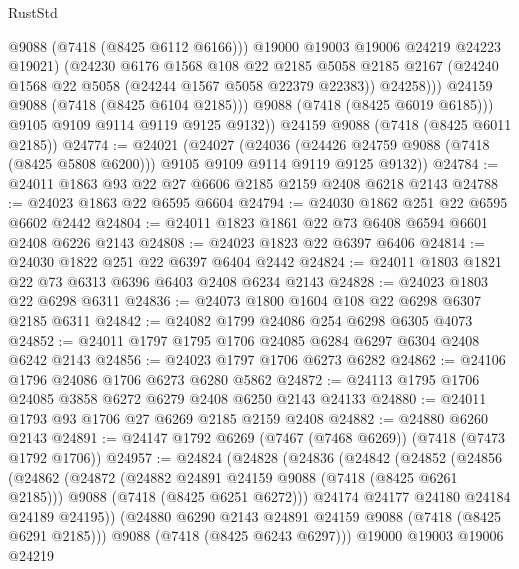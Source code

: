 \begin{lexlean}{RustStd}
\begin{coremodule}
                    @9088
                    (@7418 (@8425 @6112 @6166)))
                  @19000
                  @19003
                  @19006
                  @24219
                  @24223
                  @19021)
                (@24230
                  @6176
                  @1568
                  @108
                  @22
                  @2185
                  @5058
                  @2185
                  @2167
                  (@24240 @1568 @22 @5058 (@24244 @1567 @5058 @22379 @22383))
                  @24258)))
            @24159
            @9088
            (@7418 (@8425 @6104 @2185)))
          @9088
          (@7418 (@8425 @6019 @6185)))
        @9105
        @9109
        @9114
        @9119
        @9125
        @9132))
    @24159
    @9088
    (@7418 (@8425 @6011 @2185))
@24774 := @24021
    (@24027
      (@24036
        (@24426 @24759 @9088 (@7418 (@8425 @5808 @6200)))
        @9105
        @9109
        @9114
        @9119
        @9125
        @9132))
@24784 := @24011 @1863 @93 @22 @27 @6606 @2185 @2159 @2408 @6218 @2143
@24788 := @24023 @1863 @22 @6595 @6604
@24794 := @24030 @1862 @251 @22 @6595 @6602 @2442
@24804 := @24011 @1823 @1861 @22 @73 @6408 @6594 @6601 @2408 @6226 @2143
@24808 := @24023 @1823 @22 @6397 @6406
@24814 := @24030 @1822 @251 @22 @6397 @6404 @2442
@24824 := @24011 @1803 @1821 @22 @73 @6313 @6396 @6403 @2408 @6234 @2143
@24828 := @24023 @1803 @22 @6298 @6311
@24836 := @24073 @1800 @1604 @108 @22 @6298 @6307 @2185 @6311
@24842 := @24082 @1799 @24086 @254 @6298 @6305 @4073
@24852 := @24011 @1797 @1795 @1706 @24085 @6284 @6297 @6304 @2408 @6242 @2143
@24856 := @24023 @1797 @1706 @6273 @6282
@24862 := @24106 @1796 @24086 @1706 @6273 @6280 @5862
@24872 := @24113 @1795 @1706 @24085 @3858 @6272 @6279 @2408 @6250 @2143 @24133
@24880 := @24011 @1793 @93 @1706 @27 @6269 @2185 @2159 @2408
@24882 := @24880 @6260 @2143
@24891 := @24147 @1792 @6269 (@7467 (@7468 @6269)) (@7418 (@7473 @1792 @1706))
@24957 := @24824
    (@24828
      (@24836
        (@24842
          (@24852
            (@24856
              (@24862
                (@24872
                  (@24882 @24891 @24159 @9088 (@7418 (@8425 @6261 @2185)))
                  @9088
                  (@7418 (@8425 @6251 @6272)))
                @24174
                @24177
                @24180
                @24184
                @24189
                @24195))
            (@24880 @6290 @2143 @24891 @24159 @9088 (@7418 (@8425 @6291 @2185)))
            @9088
            (@7418 (@8425 @6243 @6297)))
          @19000
          @19003
          @19006
          @24219

\end{coremodule}
\end{lexlean}

